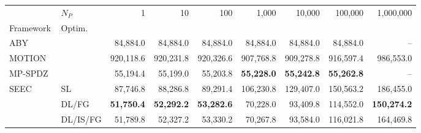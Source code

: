\begin{tabular}{llrrrrrrr}
\toprule
 & $N_P$ & 1 & 10 & 100 & 1,000 & 10,000 & 100,000 & 1,000,000 \\
Framework & Optim. &  &  &  &  &  &  &  \\
\midrule
ABY~\cite{DSZ15} &  & 84,884.0 & 84,884.0 & 84,884.0 & 84,884.0 & 84,884.0 & 84,884.0 & -- \\
\cline{1-9}
MOTION~\cite{BDST22} &  & 920,118.6 & 920,231.8 & 920,326.6 & 907,768.8 & 909,278.8 & 916,597.4 & 986,553.0 \\
\cline{1-9}
MP-SPDZ~\cite{CCS:Keller20} &  & 55,194.4 & 55,199.0 & 55,203.8 & \bfseries 55,228.0 & \bfseries 55,242.8 & \bfseries 55,262.8 & -- \\
\cline{1-9}
\multirow[c]{3}{*}{SEEC} & SL & 87,746.8 & 88,286.8 & 89,291.4 & 106,230.8 & 129,407.0 & 150,563.2 & 186,455.0 \\
 & DL/FG & \bfseries 51,750.4 & \bfseries 52,292.2 & \bfseries 53,282.6 & 70,228.0 & 93,409.8 & 114,552.0 & \bfseries 150,274.2 \\
 & DL/IS/FG & 51,789.8 & 52,327.2 & 53,330.2 & 70,267.8 & 93,584.0 & 116,021.8 & 164,469.8 \\
\bottomrule
\end{tabular}
